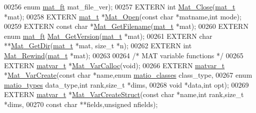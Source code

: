 \begin{DoxyCode}
00256                        \textcolor{keyword}{enum} \hyperlink{group___m_a_t_gad03442b8378999189d510e3745c702b7}{mat\_ft} mat\_file\_ver);
00257 EXTERN \textcolor{keywordtype}{int}         \hyperlink{group___m_a_t_ga101c92ff7bde4a2d4615661beba09262}{Mat\_Close}(\hyperlink{struct__mat__t}{mat\_t} *mat);
00258 EXTERN \hyperlink{struct__mat__t}{mat\_t}      *\hyperlink{group___m_a_t_gafbfedb5636a99f0ef867520c47f77d18}{Mat\_Open}(\textcolor{keyword}{const} \textcolor{keywordtype}{char} *matname,\textcolor{keywordtype}{int} mode);
00259 EXTERN \textcolor{keyword}{const} \textcolor{keywordtype}{char} *\hyperlink{group___m_a_t_ga671ff3c0247037c343b5df121ac0b824}{Mat\_GetFilename}(\hyperlink{struct__mat__t}{mat\_t} *mat);
00260 EXTERN \textcolor{keyword}{enum} \hyperlink{group___m_a_t_gad03442b8378999189d510e3745c702b7}{mat\_ft} \hyperlink{group___m_a_t_gabef04e2a55e78b0f7d9b2ddc5f42d03c}{Mat\_GetVersion}(\hyperlink{struct__mat__t}{mat\_t} *mat);
00261 EXTERN \textcolor{keywordtype}{char}      **\hyperlink{group___m_a_t_ga7c0d94860d782366ab93d9b6b068eaea}{Mat\_GetDir}(\hyperlink{struct__mat__t}{mat\_t} *mat, \textcolor{keywordtype}{size\_t} *n);
00262 EXTERN \textcolor{keywordtype}{int}         \hyperlink{group___m_a_t_ga4d6e3892d2e216c507a744ba0e070d0b}{Mat\_Rewind}(\hyperlink{struct__mat__t}{mat\_t} *mat);
00263 
00264 \textcolor{comment}{/* MAT variable functions */}
00265 EXTERN \hyperlink{group___m_a_t_structmatvar__t}{matvar\_t}  *\hyperlink{group___m_a_t_gae7c9c3699f6e9c31a9c490300013098c}{Mat\_VarCalloc}(\textcolor{keywordtype}{void});
00266 EXTERN \hyperlink{group___m_a_t_structmatvar__t}{matvar\_t}  *\hyperlink{group___m_a_t_ga1c54a84bb4d810c6fccdb8869489eac4}{Mat\_VarCreate}(\textcolor{keyword}{const} \textcolor{keywordtype}{char} *name,\textcolor{keyword}{enum} 
      \hyperlink{group___m_a_t_gad4d60ae7b709fc81bfd744fb4c857c40}{matio\_classes} class\_type,
00267                       \textcolor{keyword}{enum} \hyperlink{group___m_a_t_gacf7b3b879282b7ab3a51190e49bf3453}{matio\_types} data\_type,\textcolor{keywordtype}{int} rank,\textcolor{keywordtype}{size\_t} *dims,
00268                       \textcolor{keywordtype}{void} *data,\textcolor{keywordtype}{int} opt);
00269 EXTERN \hyperlink{group___m_a_t_structmatvar__t}{matvar\_t}  *\hyperlink{group___m_a_t_gacecdb682a50977e54ecbdc54ed5c31bf}{Mat\_VarCreateStruct}(\textcolor{keyword}{const} \textcolor{keywordtype}{char} *name,\textcolor{keywordtype}{int} rank,\textcolor{keywordtype}{size\_t} *dims,
00270                       \textcolor{keyword}{const} \textcolor{keywordtype}{char} **fields,\textcolor{keywordtype}{unsigned} nfields);

\end{DoxyCode}
